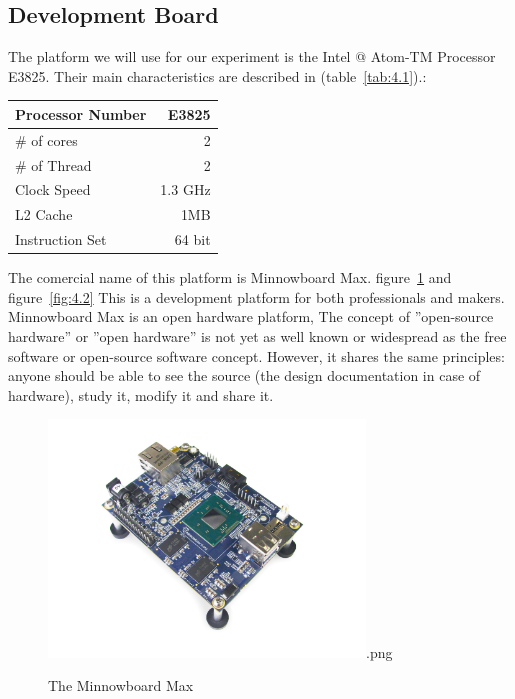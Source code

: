\subsection{Development Board} The platform we will use for our experiment is the
Intel \makeatletter @  Atom-TM Processor E3825. Their main characteristics are
described in (table~\ref{tab:4.1}).\cite{E3825}:

    \begin{center}
    \begin{tabular}{ | l | r |}
        \hline
        Processor Number & E3825  \\ \hline
        \# of cores & 2  \\ \hline
        \# of Thread & 2  \\ \hline
        Clock Speed & 1.3 GHz  \\ \hline
        L2 Cache & 1MB  \\ \hline
        Instruction Set & 64 bit  \\ \hline
    \end{tabular}
     \label{tab:4.1}
    \end{center}

The comercial name of this platform is Minnowboard Max.  figure~\ref{fig:4.1}
and  figure~\ref{fig:4.2} This is a development platform for both
professionals and makers. Minnowboard Max is an open hardware platform, The
concept of ''open-source hardware'' or ''open hardware'' is not yet as well
known or widespread as the free software or open-source software concept.
However, it shares the same principles: anyone should be able to see the source
(the design documentation in case of hardware), study it, modify it and share
it.\cite{CERN}

\begin{figure}[H]
\centering
\includegraphics[width=0.75\textwidth]{images/minnow-max.jpg}.png
\caption{The Minnowboard Max}
\label{fig:4.1}
\end{figure}


